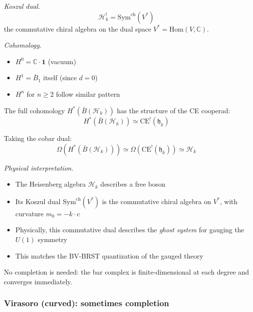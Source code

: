\begin{example}
\emph{Koszul dual.}
\[\mathcal{H}_k^! = \mathrm{Sym}^{\mathrm{ch}}(V^*)\]
the commutative chiral algebra on the dual space $V^* = \mathrm{Hom}(V, \mathbb{C})$.

\emph{Cohomology.}
\begin{itemize}
\item $H^0 = \mathbb{C} \cdot \mathbf{1}$ (vacuum)
\item $H^1 = \bar{B}_1$ itself (since $d = 0$)
\item $H^n$ for $n \geq 2$ follow similar pattern
\end{itemize}

The full cohomology $H^*(\bar{B}(\mathcal{H}_k))$ has the structure of the CE cooperad:
\[H^*(\bar{B}(\mathcal{H}_k)) \simeq \text{CE}^!(\mathfrak{h}_k)\]

Taking the cobar dual:
\[\Omega(H^*(\bar{B}(\mathcal{H}_k))) \simeq \Omega(\text{CE}^!(\mathfrak{h}_k)) \simeq \mathcal{H}_k\]

\emph{Physical interpretation.}
\begin{itemize}
\item The Heisenberg algebra $\mathcal{H}_k$ describes a free boson
\item Its Koszul dual $\mathrm{Sym}^{\mathrm{ch}}(V^*)$ is the commutative chiral algebra on $V^*$, with curvature $m_0 = -k \cdot c$
\item Physically, this commutative dual describes the \emph{ghost system} for gauging the $U(1)$ symmetry
\item This matches the BV-BRST quantization of the gauged theory
\end{itemize}

No completion is needed: the bar complex is finite-dimensional at each degree and
converges immediately.
\end{example}

\subsubsection{Virasoro (curved): sometimes completion}

